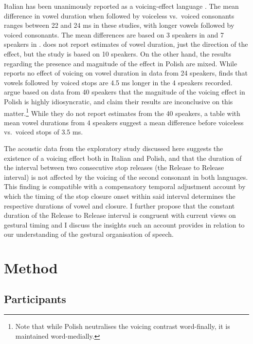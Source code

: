 \documentclass[12pt,]{article}
\let\rmarkdownfootnote\footnote%
\def\footnote{\protect\rmarkdownfootnote}
\begin{document}
Italian has been unanimously reported as a voicing-effect language
\citep{caldognetto1979, farnetani1986, esposito2002}. The mean
difference in vowel duration when followed by voiceless vs.~voiced
consonants ranges between 22 and 24 ms in these studies, with longer
vowels followed by voiced consonants. The mean differences are based on
3 speakers in \citealt{farnetani1986} and 7 speakers in
\citealt{esposito2002}. \citealt{caldognetto1979} does not report
estimates of vowel duration, just the direction of the effect, but the
study is based on 10 speakers. On the other hand, the results regarding
the presence and magnitude of the effect in Polish are mixed. While
\citet{keating1984} reports no effect of voicing on vowel duration in
data from 24 speakers, \citet{nowak2006} finds that vowels followed by
voiced stops are 4.5 ms longer in the 4 speakers recorded.
\citet{malisz2008} argue based on data from 40 speakers that the
magnitude of the voicing effect in Polish is highly idiosyncratic, and
claim their results are inconclusive on this
matter.\footnote{Note that while Polish neutralises the voicing contrast word-finally, it is maintained word-medially.}
While they do not report estimates from the 40 speakers, a table with
mean vowel durations from 4 speakers suggest a mean difference before
voiceless vs.~voiced stops of 3.5 ms.

The acoustic data from the exploratory study discussed here suggests the
existence of a voicing effect both in Italian and Polish, and that the
duration of the interval between two consecutive stop releases (the
Release to Release interval) is not affected by the voicing of the
second consonant in both languages. This finding is compatible with a
compensatory temporal adjustment account by which the timing of the stop
closure onset within said interval determines the respective durations
of vowel and closure. I further propose that the constant duration of
the Release to Release interval is congruent with current views on
gestural timing \citep{goldstein2014} and I discuss the insights such an
account provides in relation to our understanding of the gestural
organisation of speech.

\hypertarget{method}{%
\section{Method}\label{method}}

\label{s:method}

\hypertarget{participants}{%
\subsection{Participants}\label{participants}}
\end{document}
